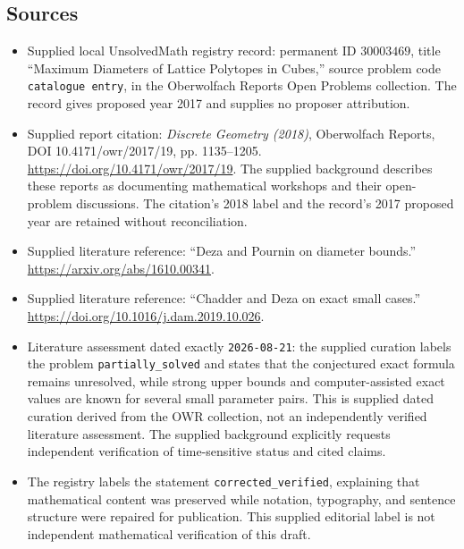 \documentclass[11pt]{article}
\begin{document}
\subsection{Sources}
\begin{itemize}
\item Supplied local UnsolvedMath registry record: permanent ID \(30003469\), title ``Maximum Diameters of Lattice Polytopes in Cubes,'' source problem code \texttt{catalogue entry}, in the Oberwolfach Reports Open Problems collection. The record gives proposed year 2017 and supplies no proposer attribution.
\item Supplied report citation: \emph{Discrete Geometry (2018)}, Oberwolfach Reports, DOI 10.4171/owr/2017/19, pp. 1135--1205. \url{https://doi.org/10.4171/owr/2017/19}. The supplied background describes these reports as documenting mathematical workshops and their open-problem discussions. The citation's 2018 label and the record's 2017 proposed year are retained without reconciliation.
\item Supplied literature reference: ``Deza and Pournin on diameter bounds.'' \url{https://arxiv.org/abs/1610.00341}.
\item Supplied literature reference: ``Chadder and Deza on exact small cases.'' \url{https://doi.org/10.1016/j.dam.2019.10.026}.
\item Literature assessment dated exactly \texttt{2026-08-21}: the supplied curation labels the problem \texttt{partially\_solved} and states that the conjectured exact formula remains unresolved, while strong upper bounds and computer-assisted exact values are known for several small parameter pairs. This is supplied dated curation derived from the OWR collection, not an independently verified literature assessment. The supplied background explicitly requests independent verification of time-sensitive status and cited claims.
\item The registry labels the statement \texttt{corrected\_verified}, explaining that mathematical content was preserved while notation, typography, and sentence structure were repaired for publication. This supplied editorial label is not independent mathematical verification of this draft.
\end{itemize}
\end{document}

